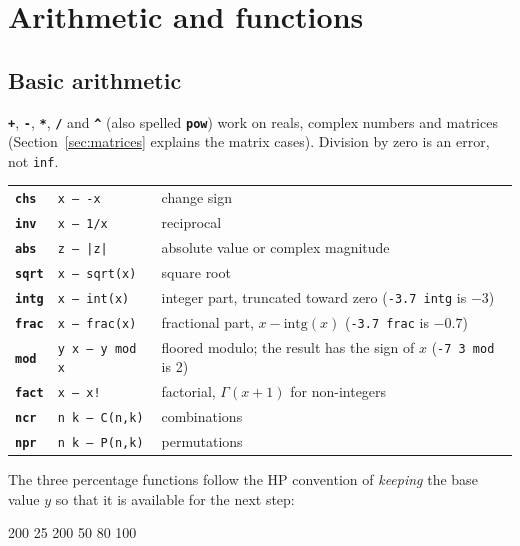 \documentclass[11pt,letterpaper]{article}
\newcommand{\code}[1]{\texttt{#1}}
\newcommand{\cmd}[1]{\texttt{\textbf{#1}}}
\newcommand{\stk}[1]{\texttt{#1}}
\begin{document}
\section{Arithmetic and functions}

\subsection{Basic arithmetic}

\cmd{+}, \cmd{-}, \cmd{*}, \cmd{/} and \cmd{\textasciicircum} (also spelled \cmd{pow}) work on reals, complex numbers and matrices (Section~\ref{sec:matrices} explains the matrix cases). Division by zero is an error, not \code{inf}.

\begin{center}
\begin{tabular}{@{}llp{}@{}}
\toprule
\cmd{chs}  & \stk{x -- -x}   & change sign \\
\cmd{inv}  & \stk{x -- 1/x}  & reciprocal \\
\cmd{abs}  & \stk{z -- |z|}  & absolute value or complex magnitude \\
\cmd{sqrt} & \stk{x -- sqrt(x)} & square root \\
\cmd{intg} & \stk{x -- int(x)}  & integer part, truncated toward zero (\code{-3.7 intg} is $-3$) \\
\cmd{frac} & \stk{x -- frac(x)} & fractional part, $x - \mathrm{intg}(x)$ (\code{-3.7 frac} is $-0.7$) \\
\cmd{mod}  & \stk{y x -- y mod x} & floored modulo; the result has the sign of $x$ (\code{-7 3 mod} is 2) \\
\cmd{fact} & \stk{x -- x!}   & factorial, $\Gamma(x+1)$ for non-integers \\
\cmd{ncr}  & \stk{n k -- C(n,k)} & combinations \\
\cmd{npr}  & \stk{n k -- P(n,k)} & permutations \\
\bottomrule
\end{tabular}
\end{center}

The three percentage functions follow the HP convention of \emph{keeping} the base value $y$ so that it is available for the next step:
\begin{rpn}
200 25 %
200 50 %
80 100 %
\end{rpn}
\end{document}
